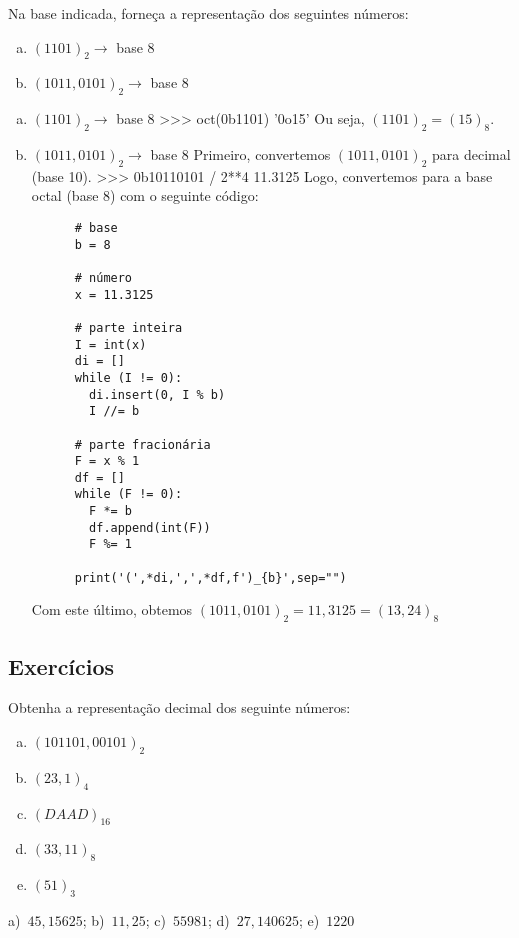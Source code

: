 \begin{exeresol}
  Na base indicada, forneça a representação dos seguintes números:
  \begin{enumerate}[a)]
  \item $(1101)_2 \to$ base 8
  \item $(1011,0101)_2 \to$ base 8
  \end{enumerate}
\end{exeresol}
\begin{resol}
  \begin{enumerate}[a)]
  \item $(1101)_2 \to$ base 8
    \ifispython
    >>> oct(0b1101)
    '0o15'
    \fi
    Ou seja, $(1101)_2 = (15)_8$.
  \item $(1011,0101)_2 \to$ base 8
    Primeiro, convertemos $(1011,0101)_2$ para decimal (base 10).
    \ifispython
    >>> 0b10110101 / 2**4
    11.3125    
    \fi
    Logo, convertemos para a base octal (base 8) com o seguinte código:
    \ifispython
    \begin{lstlisting}
      # base
      b = 8

      # número
      x = 11.3125

      # parte inteira 
      I = int(x)
      di = []
      while (I != 0):
        di.insert(0, I % b)
        I //= b

      # parte fracionária
      F = x % 1
      df = []
      while (F != 0):
        F *= b
        df.append(int(F))
        F %= 1

      print('(',*di,',',*df,f')_{b}',sep="")      
    \end{lstlisting}
    Com este último, obtemos $(1011,0101)_2 = 11,3125 = (13,24)_8$
    \fi
  \end{enumerate}  
\end{resol}

\subsection{Exercícios}

\begin{exer}
  Obtenha a representação decimal dos seguinte números:
  \begin{enumerate}[a)]
  \item $(101101,00101)_2$
  \item $(23,1)_4$
  \item $(DAAD)_{16}$
  \item $(33,11)_8$
  \item $(51)_3$
  \end{enumerate}
\end{exer}
\begin{resp}
  a)~$45,15625$; b)~$11,25$; c)~$55981$; d)~$27,140625$; e)~$1220$
\end{resp}

